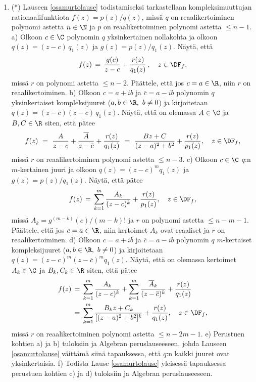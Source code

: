 \begin{enumerate}
\item (*) \label{H-int-3: osamurtohajotelma} 
Lauseen \ref{osamurtolause} todistamiseksi tarkastellaan kompleksimuuttujan
rationaalifunktiota $f(z)=p(z)/q(z)$, missä $q$ on reaalikertoiminen polynomi astetta
$n\in\N$ ja $p$ on reaalikertoiminen polynomi astetta $\le n-1$. \vspace{1mm}\newline
a) Olkoon $c\in\C$ polynomin $q$ yksinkertainen nollakohta ja olkoon 
$q(z)=(z-c)\,q_1(z)$ ja $g(z)=p(z)/q_1(z)$. Näytä, että
\[
f(z) \,=\, \frac{g(c)}{z-c}+\frac{r(z)}{q_1(z)}\,, \quad z\in\DF_f,
\]
missä $r$ on polynomi astetta $\le n-2$. Päättele, että jos $c=a\in\R$, niin $r$ on
reaalikertoiminen. \newline
b) Olkoon $c=a+ib$ ja $\overline{c}=a-ib$ polynomin $q$ yksinkertaiset kompleksijuuret
($a,b\in\R,\ b \neq 0$) ja kirjoitetaan $q(z)=(z-c)(z-\overline{c})\,q_1(z)$. Näytä, että on
olemassa $A\in\C$ ja $B,C\in\R$ siten, että pätee
\[
f(z) \ =\ \frac{A}{z-c}+\frac{\overline{A}}{z-\overline{c}} +\frac{r(z)}{q_1(z)}
     \ =\ \frac{Bz+C}{(z-a)^2+b^2}+\frac{r(z)}{p_1(z)}, \quad z\in\DF_f,
\]
missä $r$ on reaalikertoiminen polynomi astetta $\le n-3$. \newline
c) Olkoon $c\in\C$ $q$:n $m$-kertainen juuri ja olkoon $q(z)=(z-c)^mq_1(z)$ ja
$g(z)=p(z)/q_1(z)$. Näytä, että pätee
\[
f(z) \,=\, \sum_{k=1}^m \frac{A_k}{(z-c)^k}+\frac{r(z)}{p_1(z)}, \quad z\in\DF_f,
\]
missä $A_k=g^{(m-k)}(c)/(m-k)!$ ja $r$ on polynomi astetta $\le n-m-1$. Päättele, että jos
$c=a\in\R$, niin kertoimet $A_k$ ovat reaaliset ja $r$ on reaalikertoiminen. \newline
d) Olkoon $c=a+ib$ ja $\overline{c}=a-ib$ polynomin $q$ $m$-kertaiset kompleksijuuret
($a,b\in\R,\ b \neq 0$) ja kirjoitetaan $q(z)=(z-c)^m(z-\overline{c})^mq_1(z)$. Näytä, että
on olemassa kertoimet $A_k\in\C$ ja $B_k,C_k\in\R$ siten, että pätee
\begin{align*}
f(z) \,&=\, \sum_{k=1}^m \frac{A_k}{(z-c)^k}
           +\sum_{k=1}^m \frac{\overline{A}_k}{(z-\overline{c})^k}+\frac{r(z)}{q_1(z)} \\
       &=\, \sum_{k=1}^m \frac{B_kz+C_k}{[(z-a)^2+b^2]^k}+\frac{r(z)}{q_1(z)}, \quad z\in\DF_f,
\end{align*}
missä $r$ on reaalikertoiminen polynomi astetta $\le n-2m-1$. \newline
e) Perustuen kohtien a) ja b) tuloksiin ja Algebran peruslauseeseen, johda Lauseen
\ref{osamurtolause} väittämä siinä tapauksessa, että $q$:n kaikki juuret ovat
yksinkertaisia. \newline
f) Todista Lause \ref{osamurtolause} yleisessä tapauksessa perustuen kohtien c) ja d)
tuloksiin ja Algebran peruslauseeseen.


\end{enumerate}